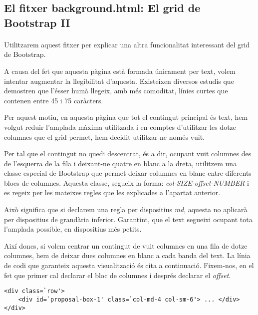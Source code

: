 \subsection{El fitxer background.html: El grid de Bootstrap II}

    \paragraph{}
    Utilitzarem aquest fitxer per explicar una altra funcionalitat interessant del grid de Bootstrap.

    A causa del fet que aquesta pàgina està formada únicament per text, volem intentar augmentar la llegibilitat d'aquesta. Existeixen diversos estudis que demostren que l'ésser humà llegeix, amb més comoditat, línies curtes que contenen entre 45 i 75 caràcters.

    Per aquest motiu, en aquesta pàgina que tot el contingut principal és text, hem volgut reduir l'amplada màxima utilitzada i en comptes d'utilitzar les dotze columnes que el grid permet, hem decidit utilitzar-ne només vuit.

    Per tal que el contingut no quedi descentrat, és a dir, ocupant vuit columnes des de l'esquerra de la fila i deixant-ne quatre en blanc a la dreta, utilitzem una classe especial de Bootstrap que permet deixar columnes en blanc entre diferents blocs de columnes. Aquesta classe, segueix la forma: \emph{col-SIZE-offset-NUMBER} i es regeix per les mateixes regles que les explicades a l'apartat anterior.

    Això significa que si declarem una regla per dispositius \emph{md}, aquesta no aplicarà per dispositius de grandària inferior. Garantint, que el text segueixi ocupant tota l'amplada possible, en dispositius més petits.

    Així doncs, si volem centrar un contingut de vuit columnes en una fila de dotze columnes, hem de deixar dues columnes en blanc a cada banda del text. La línia de codi que garanteix aquesta visualització és cita a continuació. Fixem-nos, en el fet que primer cal declarar el bloc de columnes i després declarar el \emph{offset}.

    \begin{lstlisting}[style=rawOwn,caption={Separació entre blocs de columnes d'una fila}]
<div class=`row'>
    <div id=`proposal-box-1' class=`col-md-4 col-sm-6'> ... </div>
</div>
    \end{lstlisting}
